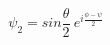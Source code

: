 \begin{equation}
\psi_2= sin \frac{\theta}{2}~e^{i \frac{\phi-\psi}{2}}  \label{eq:dellialti}
\end{equation}

